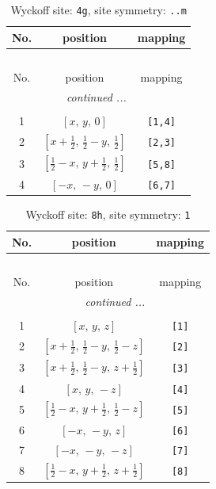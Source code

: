 \documentclass[fleqn,8pt]{jsarticle}
\begin{document}
\renewcommand{\arraystretch}{1.2}
\begin{longtable}{ccc}
\caption{Wyckoff site: {\tt 4g}, site symmetry: {\tt ..m}}
 \\
 \hline \hline
No. & position & mapping \\ \hline \endfirsthead

\multicolumn{2}{l}{\tablename\ \thetable{}} \\
 \hline \hline
No. & position & mapping \\ \hline \endhead

 \hline \hline
\multicolumn{2}{r}{\footnotesize\it continued ...} \\ \endfoot

 \hline \hline
\multicolumn{2}{r}{} \\ \endlastfoot

1 & $\left[ x,\, y,\, 0 \right]$ & {\tt [1,4]} \\ \hline
2 & $\left[ x + \frac{1}{2},\, \frac{1}{2} - y,\, \frac{1}{2} \right]$ & {\tt [2,3]} \\ \hline
3 & $\left[ \frac{1}{2} - x,\, y + \frac{1}{2},\, \frac{1}{2} \right]$ & {\tt [5,8]} \\ \hline
4 & $\left[ - x,\, - y,\, 0 \right]$ & {\tt [6,7]} \\
\end{longtable}
\renewcommand{\arraystretch}{1.2}
\begin{longtable}{ccc}
\caption{Wyckoff site: {\tt 8h}, site symmetry: {\tt 1}}
 \\
 \hline \hline
No. & position & mapping \\ \hline \endfirsthead

\multicolumn{2}{l}{\tablename\ \thetable{}} \\
 \hline \hline
No. & position & mapping \\ \hline \endhead

 \hline \hline
\multicolumn{2}{r}{\footnotesize\it continued ...} \\ \endfoot

 \hline \hline
\multicolumn{2}{r}{} \\ \endlastfoot

1 & $\left[ x,\, y,\, z \right]$ & {\tt [1]} \\ \hline
2 & $\left[ x + \frac{1}{2},\, \frac{1}{2} - y,\, \frac{1}{2} - z \right]$ & {\tt [2]} \\ \hline
3 & $\left[ x + \frac{1}{2},\, \frac{1}{2} - y,\, z + \frac{1}{2} \right]$ & {\tt [3]} \\ \hline
4 & $\left[ x,\, y,\, - z \right]$ & {\tt [4]} \\ \hline
5 & $\left[ \frac{1}{2} - x,\, y + \frac{1}{2},\, \frac{1}{2} - z \right]$ & {\tt [5]} \\ \hline
6 & $\left[ - x,\, - y,\, z \right]$ & {\tt [6]} \\ \hline
7 & $\left[ - x,\, - y,\, - z \right]$ & {\tt [7]} \\ \hline
8 & $\left[ \frac{1}{2} - x,\, y + \frac{1}{2},\, z + \frac{1}{2} \right]$ & {\tt [8]} \\
\end{longtable}
\end{document}
